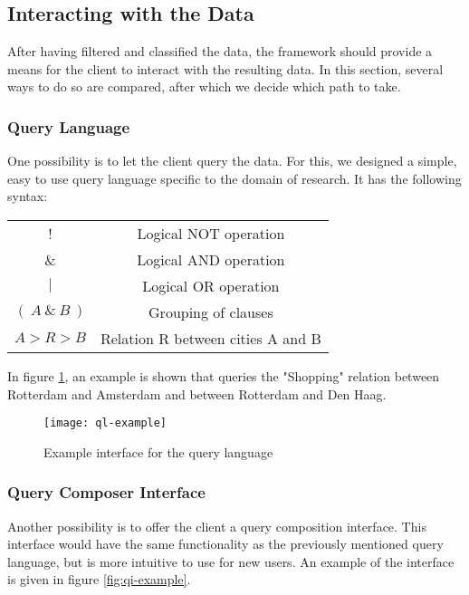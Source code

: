 \subsection{Interacting with the Data}
After having filtered and classified the data, the framework should provide a means for the client to interact with the resulting data. In this section, several ways to do so are compared, after which we decide which path to take.

\subsubsection{Query Language}

One possibility is to let the client query the data. For this, we designed a simple, easy to use query language specific to the domain of research. It has the following syntax:

\begin{center}
\begin{tabular}{ |c|c| } 
 \hline
 ! & Logical NOT operation \\
 \& & Logical AND operation \\ 
 $|$ & Logical OR operation \\ 
 $(~A~\&~B~)$ & Grouping of clauses \\
 $A > R > B$ & Relation R between cities A and B \\
 \hline
\end{tabular}
\end{center}

In figure \ref{fig:ql-example}, an example is shown that queries the "Shopping" relation between Rotterdam and Amsterdam and between Rotterdam and Den Haag.

\begin{figure}[ht]
\centering
\texttt{[image: ql-example]}
\caption{Example interface for the query language}
\label{fig:ql-example}
\end{figure}

\subsubsection{Query Composer Interface}

Another possibility is to offer the client a query composition interface. This interface would have the same functionality as the previously mentioned query language, but is more intuitive to use for new users. An example of the interface is given in figure \ref{fig:qi-example}.

